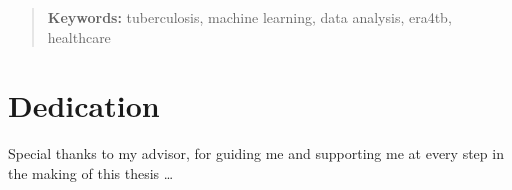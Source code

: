 \documentclass[../main.tex]{subfiles}
\begin{document}
\renewcommand\abstractname{\large\uppercase{Abstract}}
\begin{abstract}
\thispagestyle{plain}
\setcounter{page}{3}
	



\textbf{Keywords:}
tuberculosis, machine learning, data analysis, era4tb, healthcare
	
	\vfill
\end{abstract}
\newpage %
\thispagestyle{empty}
\mbox{}


\chapter*{Dedication}

\setcounter{page}{5}
	

Special thanks to my advisor, for guiding me and supporting me at every step in the making of this thesis \dots

\vspace*{\fill}
\end{document}
